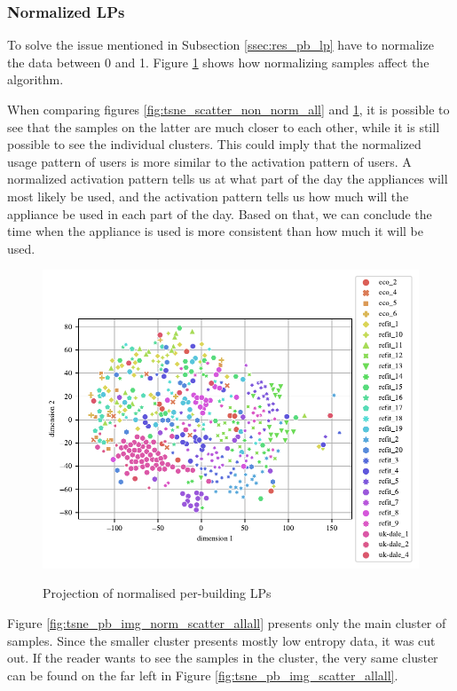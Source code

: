 \subsubsection{Normalized LPs}

To solve the issue mentioned in Subsection \ref{ssec:res_pb_lp} have to normalize the data between 0 and 1.
Figure \ref{fig:tsne_pb_scatter_all_all} shows how normalizing samples affect the algorithm.

When comparing figures \ref{fig:tsne_scatter_non_norm_all} and \ref{fig:tsne_pb_scatter_all_all},
it is possible to see that the samples on the latter are much closer to each other,
while it is still possible to see the individual clusters.
This could imply that the normalized usage pattern of users is more similar to the activation pattern of users.
A normalized activation pattern tells us at what part of the day the appliances will most likely be used,
and the activation pattern tells us how much will the appliance be used in each part of the day.
Based on that, we can conclude the time when the appliance is used is more consistent than how much it will be used. 


\begin{figure}[H]
	\centering
	\caption{Projection of normalised per-building LPs}
	\includegraphics[]{Figures/TSNE/TSNE_per_building/scatter_per_building_norm.pdf}
	\label{fig:tsne_pb_scatter_all_all}
\end{figure}

Figure \ref{fig:tsne_pb_img_norm_scatter_allall} presents only the main cluster of samples.
Since the smaller cluster presents mostly low entropy data, it was cut out. 
If the reader wants to see the samples in the cluster, the very same cluster can be found on the far left in Figure \ref{fig:tsne_pb_img_scatter_allall}.

